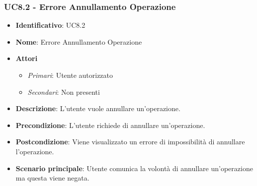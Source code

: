 \subsubsection{UC8.2 - Errore Annullamento Operazione}
\begin{itemize}
	\item \textbf{Identificativo}: UC8.2
	\item \textbf{Nome}: Errore Annullamento Operazione 
	\item \textbf{Attori}
	\begin{itemize} 
		\item \textit{Primari}: Utente autorizzato
		\item \textit{Secondari}: Non presenti
	\end{itemize}
	\item \textbf{Descrizione}: L'utente vuole annullare un'operazione.
	\item \textbf{Precondizione}: L'utente richiede di annullare un'operazione.
	\item \textbf{Postcondizione}: Viene visualizzato un errore di impossibilità di annullare l'operazione.
	\item \textbf{Scenario principale}: Utente comunica la volontà di annullare un'operazione ma questa viene negata.
\end{itemize}